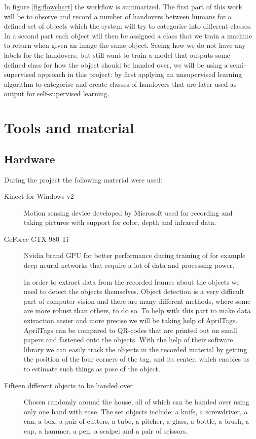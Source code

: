 In figure \ref{fig:flowchart} the workflow is summarized. The first part of this work will be to observe and record a number of handovers between humans for a defined set of objects which the system will try to categorise into different classes. In a second part each object will then be assigned a class that we train a machine to return when given an image the same object. Seeing how we do not have any labels for the handovers, but still want to train a model that outputs some defined class for how the object should be handed over, we will be using a semi-supervised approach in this project: by first applying an unsupervised learning algorithm to categorise and create classes of handovers that are later used as output for self-supervised learning.


\section{Tools and material}

\subsection*{Hardware}

During the project the following material were used:

\begin{description}
	\item[Kinect for Windows v2] Motion sensing device developed by Microsoft used for recording and taking pictures with support for color, depth and infrared data.

	\item[GeForce GTX 980 Ti] Nvidia brand GPU for better performance during training of for example deep neural networks that require a lot of data and processing power.

	\item[\textcite{AprilTags}] In order to extract data from the recorded frames about the objects we need to detect the objects themselves. Object detection is a very difficult part of computer vision and there are many different methods, where some are more robust than others, to do so. To help with this part to make data extraction easier and more precise we will be taking help of AprilTags. AprilTags can be compared to QR-codes that are printed out on small papers and fastened onto the objects. With the help of their software library we can easily track the objects in the recorded material by getting the position of the four corners of the tag, and its center, which enables us to estimate such things as pose of the object.

	\item[Fifteen different objects to be handed over] Chosen randomly around the house, all of which can be handed over using only one hand with ease. The set objects include: a knife, a screwdriver, a can, a box, a pair of cutters, a tube, a pitcher, a glass, a bottle, a brush, a cup, a hammer, a pen, a scalpel and a pair of scissors.

\end{description}

